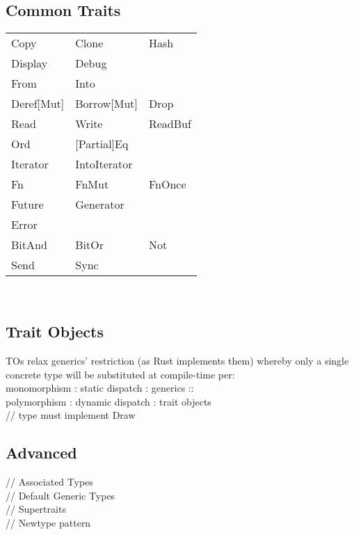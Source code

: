 \subsection*{Common Traits}
\begin{tabular}{l l l}
    Copy & Clone & Hash  \\
    Display & Debug \\
    From & Into \\
    Deref[Mut] & Borrow[Mut] & Drop \\
    Read & Write & ReadBuf \\[0pt] 
    [Partial]Ord & [Partial]Eq & \\
    Iterator & IntoIterator \\
    Fn & FnMut & FnOnce \\
    Future & Generator & \\
    Error & & \\
    BitAnd & BitOr & Not \\
    Send & Sync & \\
\end{tabular} \
\\
\subsection*{Trait Objects}
TOs relax generics' restriction (as Rust implements them) whereby only a single concrete type will be substituted at compile-time per: \\ 
monomorphism : static dispatch : generics :: \\
polymorphism : dynamic dispatch : trait objects
\\
 // type must implement Draw \\

\subsection*{Advanced}
// Associated Types \\
// Default Generic Types \\ 
// Supertraits \\
// Newtype pattern \\